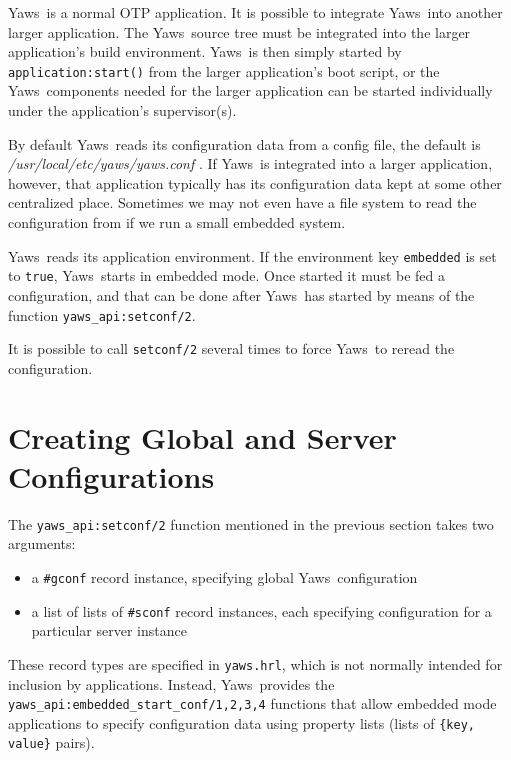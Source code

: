 \documentclass[11pt,oneside,english]{book}
\newcommand{\Yaws}            %
        {{\sc Yaws}}
\begin{document}
\Yaws\  is a normal OTP application. It is possible to integrate \Yaws\
into another larger application. The \Yaws\  source tree must be
integrated into the larger application's build environment. \Yaws\  is
then simply started by \verb+application:start()+ from the larger
application's boot script, or the \Yaws\  components needed for the
larger application can be started individually under the application's
supervisor(s).

By default \Yaws\ reads its configuration data from a config file, the
default is \textit{/usr/local/etc/yaws/yaws.conf} . If \Yaws\ is integrated
into a larger application, however, that application typically has its
configuration data kept at some other centralized place. Sometimes we
may not even have a file system to read the configuration from if we
run a small embedded system.

\Yaws\  reads its application environment. If the environment key
\verb+embedded+ is set to \verb+true+, \Yaws\  starts in embedded mode.
Once started it must be fed a configuration, and that can be done
after \Yaws\  has started by means of the function
\verb+yaws_api:setconf/2+.

It is possible to call \verb+setconf/2+ several times to force \Yaws\  to
reread the configuration.

\section{Creating Global and Server Configurations}

The \verb+yaws_api:setconf/2+ function mentioned in the previous
section takes two arguments:

\begin{itemize}

\item a \verb+#gconf+ record instance, specifying global
  \Yaws\ configuration

\item a list of lists of \verb+#sconf+ record instances, each
  specifying configuration for a particular server instance

\end{itemize}

These record types are specified in \verb+yaws.hrl+, which is not
normally intended for inclusion by applications. Instead,
\Yaws\  provides the \verb+yaws_api:embedded_start_conf/1,2,3,4+
functions that allow embedded mode applications to specify
configuration data using property lists (lists of
\verb+{key, value}+ pairs).
\end{document}
